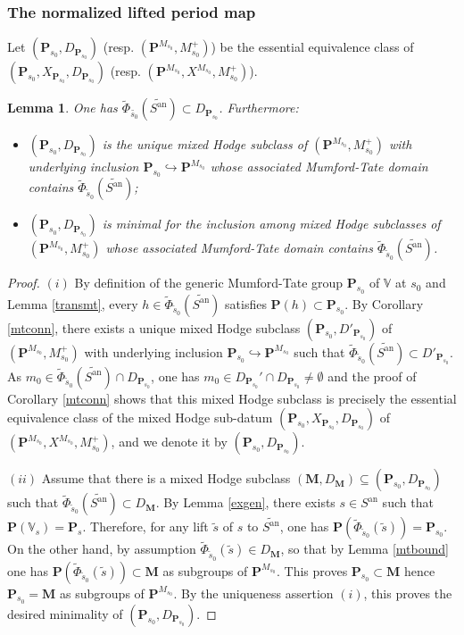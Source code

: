 \documentclass[10pt]{article}
\numberwithin{equation}{subsection}
\theoremstyle{plain}
\newtheorem{lemma}[theorem]{Lemma}
\theoremstyle{definition}
\theoremstyle{remark}
\newcommand{\V}{\mathbb V}
\newcommand{\pp}{\mathbf P}
\newcommand{\M}{\mathbf M}
\newcommand{\an}{\mathrm{an}}
\begin{document}
\subsubsection*{The normalized lifted period map}
Let $(\pp_{s_0}, D_{\pp_{s_0}})$ (resp. $(\pp^{M_{s_0}}, M_{s_0}^+)$) be the essential equivalence class of $(\pp_{s_0}, X_{\pp_{s_0}}, D_{\pp_{s_0}})$ (resp. $(\pp^{M_{s_0}}, X^{M_{s_0}}, M_{s_0}^+)$). 
\begin{lemma}\label{uniqmhc}
One has $\tilde{\Phi}_{\tilde{s_0}}(\widetilde{S^\an}) \subset D_{\pp_{s_0}}$. Furthermore:
\begin{itemize}
\item[(i)] $(\pp_{s_0}, D_{\pp_{s_0}})$ is the unique mixed Hodge subclass of $(\pp^{M_{s_0}}, M_{s_0}^+)$ with underlying inclusion $\pp_{s_0} \hookrightarrow \pp^{M_{s_0}}$ whose associated Mumford-Tate domain contains $\tilde{\Phi}_{\tilde{s}_0}(\widetilde{S^\an})$;
\item[(ii)] $(\pp_{s_0}, D_{\pp_{s_0}})$ is minimal for the inclusion among mixed Hodge subclasses of $(\pp^{M_{s_0}}, M_{s_0}^+)$ whose associated Mumford-Tate domain contains $\tilde{\Phi}_{\tilde{s}_0}(\widetilde{S^\an})$.
\end{itemize}
\end{lemma}
\begin{proof}
$(i)$ By definition of the generic Mumford-Tate group $\pp_{s_0}$ of $\V$ at $s_0$ and Lemma \ref{transmt}, every $h \in \tilde{\Phi}_{\tilde{s}_0}(\widetilde{S^\an})$ satisfies $\pp(h) \subset \pp_{s_0}$. By Corollary \ref{mtconn}, there exists a unique mixed Hodge subclass $(\pp_{s_0}, D'_{\pp_{s_0}})$ of $(\pp^{M_{s_0}}, M_{s_0}^+)$ with underlying inclusion $\pp_{s_0} \hookrightarrow \pp^{M_{s_0}}$ such that $\tilde{\Phi}_{\tilde{s}_0}(\widetilde{S^\an}) \subset D'_{\pp_{s_0}}$. As $m_0 \in \tilde{\Phi}_{\tilde{s}_0}(\widetilde{S^\an})\cap D_{\pp_{s_0}}$, one has $m_0 \in D_{\pp_{s_0}}' \cap D_{\pp_{s_0}} \neq \emptyset$ and the proof of Corollary \ref{mtconn} shows that this mixed Hodge subclass is precisely the essential equivalence class of the mixed Hodge sub-datum $(\pp_{s_0}, X_{\pp_{s_0}}, D_{\pp_{s_0}})$ of $(\pp^{M_{s_0}}, X^{M_{s_0}}, M_{s_0}^+)$, and we denote it by $(\pp_{s_0}, D_{\pp_{s_0}})$. 

$(ii)$ Assume that there is a mixed Hodge subclass $(\M,D_\M) \subseteq (\pp_{s_0}, D_{\pp_{s_0}})$ such that $\tilde{\Phi}_{\tilde{s}_0}(\widetilde{S^\an}) \subset D_\M$. By Lemma \ref{exgen}, there exists $s \in S^\an$ such that $\pp(\V_s) = \pp_s$. Therefore, for any lift $\tilde{s}$ of $s$ to $\widetilde{S^\an}$, one has $\pp(\tilde{\Phi}_{\tilde{s}_0}(\tilde{s})) = \pp_{s_0}$. On the other hand, by assumption $\tilde{\Phi}_{\tilde{s}_0}(\tilde{s}) \in D_\M$, so that by Lemma \ref{mtbound} one has $\pp(\tilde{\Phi}_{\tilde{s}_0}(\tilde{s})) \subset \M$ as subgroups of $\pp^{M_{s_0}}$. This proves $\pp_{s_0} \subset \M$ hence $\pp_{s_0} = \M$ as subgroups of $\pp^{M_{s_0}}$. By the uniqueness assertion $(i)$, this proves the desired minimality of $(\pp_{s_0}, D_{\pp_{s_0}})$.
\end{proof}
\end{document}
